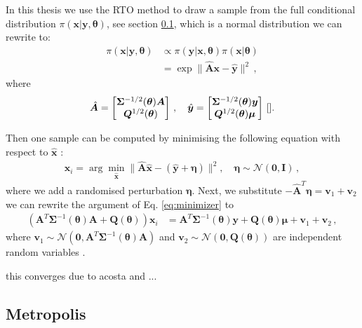 In this thesis we use the RTO method to draw a sample from the full conditional distribution $\pi( \bm{x}| \bm{y} , \bm{\theta} )$, see section \ref{}, which is a normal distribution we can rewrite to:
\begin{align}
	\pi(\bm{x}|\bm{y}, \bm{\theta} ) &\propto \pi(\bm{y} | \bm{x} , \bm{\theta} ) \pi(\bm{x}| \bm{\theta}) \\
	&= \exp  \lVert \hat{\bm{A}} \bm{x} - \hat{\bm{y}} \rVert^2 \, ,
\end{align}
where 
\begin{align}
	\label{eq:minimizer}
	\hat{\bm{A}} = 
	\begin{bmatrix}
		\bm{\Sigma}^{-1/2}(\bm{\theta})  \bm{A}\\
		\bm{Q}^{1/2}(\bm{\theta}) 
	\end{bmatrix} \, , \quad \hat{\bm{y}} = 
	\begin{bmatrix}
		\bm{\Sigma}^{-1/2}(\bm{\theta})  \bm{y} \\
		\bm{Q}^{1/2}(\bm{\theta}) \bm{\mu}
	\end{bmatrix} \, \text{\cite{}}.
\end{align}

Then one sample can be computed by minimising the following equation with respect to $\hat{\bm{x}}$ :
\begin{align}
	\bm{x}_i = \arg \min_{\hat{\bm{x}}} \lVert \hat{\bm{A}} \hat{\bm{x}} - ( \hat{\bm{y}} + \bm{\eta} ) \rVert^2 , \quad \bm{\eta} \sim \mathcal{N}(\bm{0}, \mathbf{I}) \, ,
\end{align}
where we add a randomised perturbation $\bm{\eta}$.
Next, we substitute $ - \hat{\bm{A}}^T  \bm{\eta}  = \bm{v}_1 + \bm{v}_2$ we can rewrite the argument of Eq. \ref{eq:minimizer} to 
\begin{align}
	\label{eq:RTO}
	(\bm{A}^T \bm{\Sigma}^{-1}(\bm{\theta}) \bm{A}+
	\bm{Q}(\bm{\theta}) ) \bm{x}_i &= \bm{A}^T \bm{\Sigma}^{-1}(\bm{\theta}) \bm{y} +  \bm{Q}(\bm{\theta}) \bm{\mu} + \bm{v}_1 + \bm{v}_2 \,  ,
\end{align}
where $\bm{v}_1 \sim \mathcal{N}(\bm{0}, \bm{A}^T \bm{\Sigma}^{-1}(\bm{\theta}) \bm{A}) $ and $\bm{v}_2 \sim \mathcal{N}(\bm{0}, \bm{Q}(\bm{\theta}) )$ are independent random variables \cite{}.

this converges due to acosta and ...

\subsection{Metropolis}

